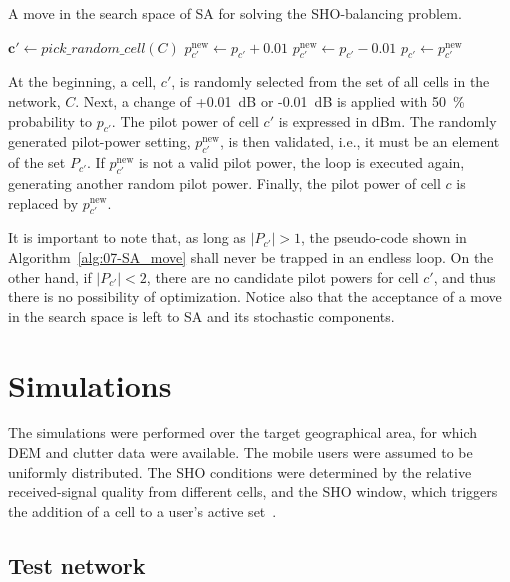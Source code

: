 \begin{algorithm}
\centering

\caption{A move in the search space of SA for solving the SHO-balancing problem.\label{alg:07-SA_move}}


\begin{algorithmic}
\State $\mathbf{c'} \gets pick\_random\_cell(C)$
\Repeat
		\State $p_{c'}^{\mathrm{new}} \gets p_{c'}+0.01$
	\Else
		\State $p_{c'}^{\mathrm{new}} \gets p_{c'}-0.01$
	\EndIf
{}
\State $p_{c'} \gets p_{c'}^{\mathrm{new}}$
\end{algorithmic}
\end{algorithm}


At the beginning, a cell, $c'$, is randomly selected from the set
of all cells in the network, $C$. Next, a change of +0.01~dB or
-0.01~dB is applied with 50~\% probability to $p_{c'}$. The pilot
power of cell $c'$ is expressed in dBm. The randomly generated pilot-power
setting, $p_{c'}^{\mathrm{new}}$, is then validated, i.e., it must
be an element of the set $P_{c'}$. If $p_{c'}^{\mathrm{new}}$ is
not a valid pilot power, the loop is executed again, generating another
random pilot power. Finally, the pilot power of cell $c$ is replaced
by $p_{c'}^{\mathrm{new}}$.

It is important to note that, as long as $|P_{c'}|>1$, the pseudo-code
shown in Algorithm~\ref{alg:07-SA_move} shall never be trapped in
an endless loop. On the other hand, if $|P_{c'}|<2$, there are no
candidate pilot powers for cell $c'$, and thus there is no possibility
of optimization. Notice also that the acceptance of a move in the
search space is left to SA and its stochastic components.


\section{Simulations \label{sec:07-Simulations}}

The simulations were performed over the target geographical area,
for which DEM and clutter data were available. The mobile users were
assumed to be uniformly distributed. The SHO conditions were determined
by the relative received-signal quality from different cells, and
the SHO window, which triggers the addition of a cell to a user's
active set~\cite{WCDMAforUMTS_RadioAccessForThirdGenerationMobileCommunications}.


\subsection{Test network}

